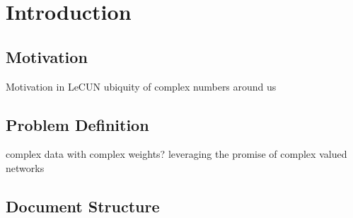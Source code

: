 \chapter{Introduction} \label{chap:intro}

\section{Motivation} \label{sect:thefirst}
Motivation in LeCUN
ubiquity of complex numbers around us

\section{Problem Definition} \label{sect:thefirst}
complex data with complex weights?
leveraging the promise of complex valued networks

\section{Document Structure} \label{sect:thefirst}





